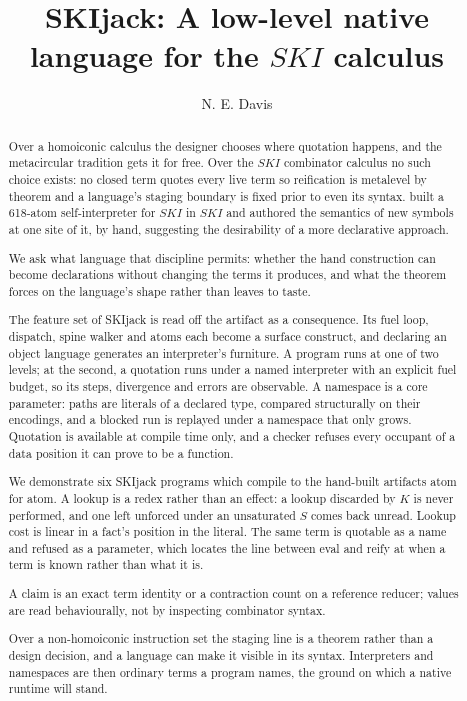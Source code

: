 \documentclass[english,submission,code=tt]{programming}
\title{SKIjack:  A low-level native language for the $SKI$ calculus}
\author{N. E. Davis}[https://orcid.org/0000-0002-1131-8319]
\affiliation{ZeroAttest, Champaign, Illinois, USA}
\begin{document}
\maketitle

\begin{abstract}
Over a homoiconic calculus the designer chooses where quotation
happens, and the metacircular tradition gets it for free.  Over the
$SKI$ combinator calculus no such choice exists: no closed term quotes
every live term so reification is metalevel by theorem and a
language's staging boundary is fixed prior to even its syntax.
\citet{Davis2027} built a 618-atom self-interpreter for $SKI$ in $SKI$
and authored the semantics of new symbols at one site of it, by hand,
suggesting the desirability of a more declarative approach.

We ask what language that discipline permits: whether the hand
construction can become declarations without changing the terms it
produces, and what the theorem forces on the language's shape rather
than leaves to taste.

The feature set of SKIjack is read off the artifact as a consequence.
Its fuel loop, dispatch, spine walker and atoms each become a surface
construct, and declaring an object language generates an interpreter's
furniture.  A program runs at one of two levels; at the second, a
quotation runs under a named interpreter with an explicit fuel budget,
so its steps, divergence and errors are observable.  A namespace is a
core parameter: paths are literals of a declared type, compared
structurally on their encodings, and a blocked run is replayed under a
namespace that only grows.  Quotation is available at compile time
only, and a checker refuses every occupant of a data position it can
prove to be a function.

We demonstrate six SKIjack programs which compile to the hand-built 
artifacts atom for atom.  A lookup is a redex rather than an effect: a
lookup discarded by $K$ is never performed, and one left unforced under
an unsaturated $S$ comes back unread.  Lookup cost is linear in a fact's
position in the literal.  The same term is quotable as a name and
refused as a parameter, which locates the line between eval and reify
at when a term is known rather than what it is.

A claim is an exact term identity or a contraction count on a
reference reducer; values are read behaviourally, not by inspecting
combinator syntax.

Over a non-homoiconic instruction set the staging line is a theorem
rather than a design decision, and a language can make it visible in
its syntax.  Interpreters and namespaces are then ordinary terms a
program names, the ground on which a native runtime will stand.
\end{abstract}
\end{document}

